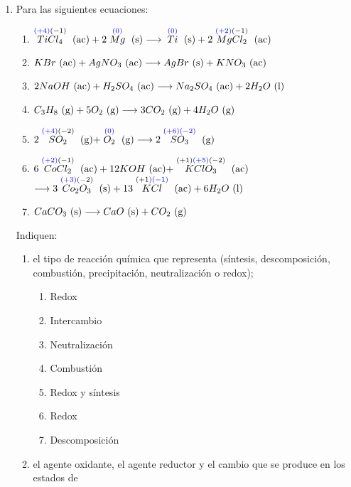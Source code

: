\documentclass[../Práctica.root.tex]{subfiles}
\begin{document}
\begin{enumerate}
    \item Para las siguientes ecuaciones: \\
          \begin{enumerate}
              \item $\stackrel{\textcolor{blue}{(+4)}(-1)}{TiCl_4} \ \text{(ac)} + 2 \stackrel{\textcolor{blue}{(0)}}{Mg} \ \text{(s)} \longrightarrow{} \stackrel{\textcolor{blue}{(0)}}{Ti} \ \text{(s)} + 2 \stackrel{\textcolor{blue}{(+2)}(-1)}{MgCl_2} \ \text{(ac)}$
              \item $KBr \ \text{(ac)} + AgNO_3 \ \text{(ac)} \longrightarrow{} AgBr \ \text{(s)} + KNO_3 \ \text{(ac)}$
              \item $2 NaOH \ \text{(ac)} + H_2SO_4 \ \text{(ac)} \longrightarrow{} Na_2SO_4 \ \text{(ac)} + 2 H_2O \ \text{(l)}$
              \item $C_3H_8 \ \text{(g)} + 5 O_2 \ \text{(g)} \longrightarrow{} 3 CO_2 \ \text{(g)} + 4 H_2O \ \text{(g)}$
              \item $2 \stackrel{\textcolor{blue}{(+4)}(-2)}{SO_2} \ \text{(g)} + \stackrel{\textcolor{blue}{(0)}}{O_2} \ \text{(g)} \longrightarrow{} 2 \stackrel{\textcolor{blue}{(+6)(-2)}}{SO_3} \ \text{(g)}$
              \item $6 \stackrel{\textcolor{blue}{(+2)}(-1)}{CoCl_2} \ \text{(ac)} + 12 KOH \ \text{(ac)} + \stackrel{(+1)\textcolor{blue}{(+5)}(-2)}{KClO_3} \ \text{(ac)}$
                    $\longrightarrow{} 3 \stackrel{\textcolor{blue}{(+3)}(-2)}{Co_2O_3} \ \text{(s)} + 13 \stackrel{(+1)\textcolor{blue}{(-1)}}{KCl} \ \text{(ac)} + 6 H_2O \ \text{(l)}$
              \item $CaCO_3 \ \text{(s)} \longrightarrow{} CaO \ \text{(s)} + CO_2 \ \text{(g)}$
          \end{enumerate}
          Indiquen:
          \begin{enumerate}
              \item el tipo de reacción química que representa (síntesis, descomposición, combustión,
                    precipitación, neutralización o redox);
                    \begin{enumerate}[label=\alph*)]
                        \item Redox
                        \item Intercambio
                        \item Neutralización
                        \item Combustión
                        \item Redox y síntesis
                        \item Redox
                        \item Descomposición
                    \end{enumerate}
              \item el agente oxidante, el agente reductor y el cambio que se produce en los estados de

\end{enumerate}
\end{enumerate}
\end{document}
